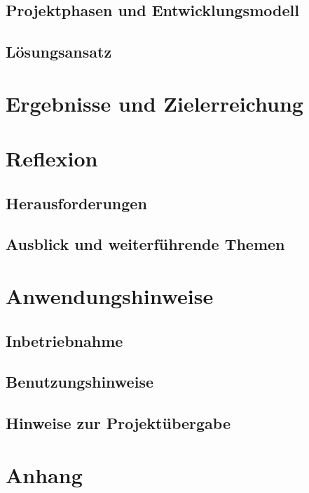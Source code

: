 \documentclass[
	11pt, 
	a4paper, 
	twoside, 
	openright, 
	titlepage=firstiscover, 
	numbers=noenddot, 
	BCOR=12mm,
	headsepline,
	footsepline,
	toc=listof,
	toc=bibliography
	]{scrbook}
\begin{document}
	\section{Projektphasen und Entwicklungsmodell}
	\section{Lösungsansatz}
	
	\chapter{Ergebnisse und Zielerreichung}
	
	\chapter{Reflexion}
	\section{Herausforderungen}
	\section{Ausblick und weiterführende Themen}
	
	\chapter{Anwendungshinweise}
	\section{Inbetriebnahme}
	\section{Benutzungshinweise}
	\section{Hinweise zur Projektübergabe}
	
\cleardoublepage
{}
	
	\appendix
	
	\chapter{Anhang}
	
	
	
\end{document}
